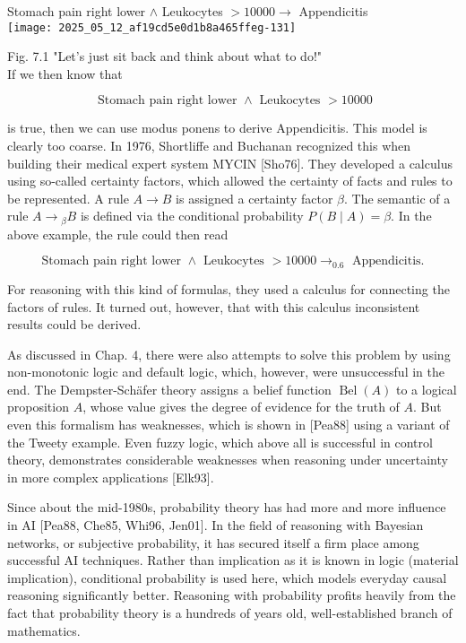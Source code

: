 \documentclass[10pt]{article}
\begin{document}
Stomach pain right lower $\wedge$ Leukocytes $>10000 \rightarrow$ Appendicitis\\
\texttt{[image: 2025\_05\_12\_af19cd5e0d1b8a465ffeg-131]}

Fig. 7.1 "Let's just sit back and think about what to do!"\\
If we then know that

$$
\text { Stomach pain right lower } \wedge \text { Leukocytes }>10000
$$

is true, then we can use modus ponens to derive Appendicitis. This model is clearly too coarse. In 1976, Shortliffe and Buchanan recognized this when building their medical expert system MYCIN [Sho76]. They developed a calculus using so-called certainty factors, which allowed the certainty of facts and rules to be represented. A rule $A \rightarrow B$ is assigned a certainty factor $\beta$. The semantic of a rule $A \rightarrow{ }_{\beta} B$ is defined via the conditional probability $P(B \mid A)=\beta$. In the above example, the rule could then read

$$
\text { Stomach pain right lower } \wedge \text { Leukocytes }>10000 \rightarrow_{0.6} \text { Appendicitis. }
$$

For reasoning with this kind of formulas, they used a calculus for connecting the factors of rules. It turned out, however, that with this calculus inconsistent results could be derived.

As discussed in Chap. 4, there were also attempts to solve this problem by using non-monotonic logic and default logic, which, however, were unsuccessful in the end. The Dempster-Schäfer theory assigns a belief function $\operatorname{Bel}(A)$ to a logical proposition $A$, whose value gives the degree of evidence for the truth of $A$. But even this formalism has weaknesses, which is shown in [Pea88] using a variant of the Tweety example. Even fuzzy logic, which above all is successful in control theory, demonstrates considerable weaknesses when reasoning under uncertainty in more complex applications [Elk93].

Since about the mid-1980s, probability theory has had more and more influence in AI [Pea88, Che85, Whi96, Jen01]. In the field of reasoning with Bayesian networks, or subjective probability, it has secured itself a firm place among successful AI techniques. Rather than implication as it is known in logic (material implication), conditional probability is used here, which models everyday causal reasoning significantly better. Reasoning with probability profits heavily from the fact that probability theory is a hundreds of years old, well-established branch of mathematics.
\end{document}
